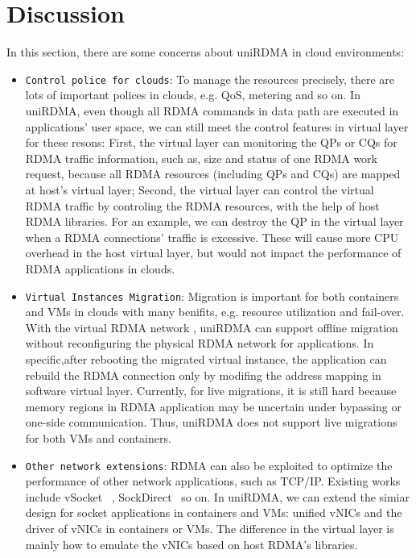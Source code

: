 \section{Discussion}
In this section, there are some concerns about uniRDMA in cloud environments:
\begin{itemize}
	\item {\verb|Control police for clouds|}: To manage the resources precisely, there are lots of important polices in clouds, e.g. QoS, metering and so on. In uniRDMA, even though all RDMA commands in data path are executed in applications' user space, we can still meet the control features in virtual layer for these resons:  First,  the virtual layer can monitoring the QPs or CQs for RDMA traffic information, such as,  size and status of one RDMA work request, because all RDMA resources (including QPs and CQs) are mapped at host's virtual layer; Second, the virtual layer can  control the virtual RDMA traffic by controling the RDMA resources,  with the help of host RDMA libraries. For an example,  we can destroy the QP in the virtual layer when a RDMA connections' traffic is excessive.  These will cause more CPU overhead in the host virtual layer, but would not impact the performance of RDMA applications in clouds.

	\item {\verb|Virtual Instances Migration|}: Migration is important  for both containers and VMs in clouds with many benifits, e.g. resource utilization and fail-over. With the virtual RDMA network , uniRDMA can support offline migration without reconfiguring the physical RDMA network for applications. In specific,after rebooting the migrated virtual instance, the application can rebuild the RDMA connection  only by modifing the address mapping in software virtual layer. Currently, for live migrations, it is still hard because memory regions in RDMA application may be uncertain under bypassing or one-side communication. Thus, uniRDMA does not support live migrations for both VMs and containers.
	
	\item {\verb|Other network extensions|}: RDMA can also be exploited to optimize the performance of other network applications,  such as TCP/IP.  Existing works include vSocket ~\cite{wang2019vsocket}, SockDirect~\cite{li2019socksdirect} so on. In uniRDMA, we can extend the simiar design for socket applications in containers and VMs: unified vNICs and the driver of vNICs in containers or VMs.  The difference in the virtual layer is mainly how to emulate the vNICs based on host RDMA's libraries. 
	
\end{itemize}
